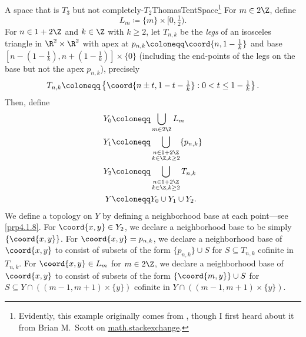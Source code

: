 \begin{exm}{A space that is $T_3$ but not completely-$T_2$}{ThomasTentSpace}\footnote{Evidently, this example originally comes from \cite{Thomas}, though I first heard about it from Brian M.~Scott on \href{http://math.stackexchange.com/questions/386742/making-Tychonoff-corkscrew-in-counterexamples-in-topology-rigorous}{math.stackexchange}.}
For $m\in 2\Z$, define
\begin{equation}
L_m\coloneqq \{ m\} \times [0,\tfrac{1}{2}).
\end{equation}
For $n\in 1+2\Z$ and $k\in \Z$ with $k\geq 2$, let $T_{n,k}$ be the \emph{legs} of an isosceles triangle in $\R ^2\times \R ^2$ with apex at $p_{n,k}\coloneqq \coord{n,1-\frac{1}{k}}$ and base $[n-(1-\frac{1}{k}),n+(1-\frac{1}{k})]\times \{ 0\}$ (including the end-points of the legs on the base but not the apex $p_{n,k}$), precisely
\begin{equation}
T_{n,k}\coloneqq \left\{ \coord{n\pm t,1-t-\tfrac{1}{k}}:0<t\leq 1-\tfrac{1}{k}\right\} .
\end{equation}
Then, define
\begin{equation}
\begin{split}
Y_0 & \coloneqq \bigcup _{m\in 2\Z}L_m \\
Y_1 & \coloneqq \bigcup _{\substack{n\in 1+2\Z \\ k\in \Z ,k\geq 2}}\{ p_{n,k}\} \\
Y_2 & \coloneqq \bigcup _{\substack{n\in 1+2\Z \\ k\in \Z ,k\geq 2}}T_{n,k} \\
Y & \coloneqq Y_0\cup Y_1\cup Y_2.
\end{split}
\end{equation}
We define a topology on $Y$ by defining a neighborhood base at each point---see \cref{prp4.1.8}.  For $\coord{x,y}\in Y_2$, we declare a neighborhood base to be simply $\{ \coord{x,y}\}$.  For $\coord{x,y}=p_{n,k}$, we declare a neighborhood base of $\coord{x,y}$ to consist of subsets of the form $\{ p_{n,k}\} \cup S$ for $S\subseteq T_{n,k}$ cofinite in $T_{n,k}$.  For $\coord{x,y}\in L_m$ for $m\in 2\Z$, we declare a neighborhood base of $\coord{x,y}$ to consist of subsets of the form $\{ \coord{m,y}\}\cup S$ for $S\subseteq Y\cap \left( (m-1,m+1)\times \{ y\}\right)$ cofinite in $Y\cap \left( (m-1,m+1)\times \{ y\}\right)$. 


\end{exm}
